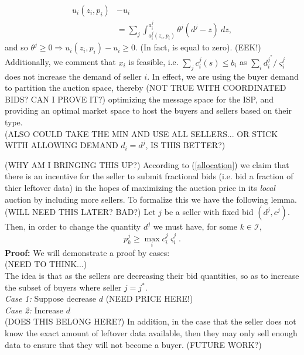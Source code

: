 \documentclass[12pt]{article}
\theoremstyle{definition}
\newcommand{\vs}{\varsigma}
\newcommand{\mcI}{\mathcal{I}}
\begin{document}
\begin{multicols}{2}
\begin{align*}
    u_i(z_i,p_i) &- u_i \\
    &=\displaystyle\sum_{j}\int_{a_i^j(z_i,p_i)}^{a_i^j} \theta^j(d^j
-z) \ dz,
\end{align*}
and so $\theta^j\ge 0 \Rightarrow u_i(z_i,p_i) - u_i \ge 0$. (In fact, is equal to
zero). (EEK!)\\
Additionally, we comment that $x_i$ is feasible, i.e. $\sum_j c_i^j(s) \le b_i$
as $\sum_i d_i^{j^*}/\vs_i^j$ does not increase the demand of seller $i$.
In effect, we are using the buyer demand
to partition the auction space, thereby (NOT TRUE WITH COORDINATED BIDS? CAN I
PROVE IT?) optimizing the message space for the
ISP, and providing an optimal market space to host the buyers and sellers based
on their type. \\
(ALSO COULD TAKE THE MIN AND USE ALL SELLERS... OR STICK WITH ALLOWING DEMAND
$d_i=d^j$, IS THIS BETTER?)

(WHY AM I BRINGING THIS UP?) According to
(\ref{allocation}) we claim that there is an incentive for the seller to
submit fractional bids (i.e. bid a fraction of thier leftover data) in the hopes
of maximizing the auction price in its
\emph{local} auction by including more sellers. To
formalize this we have the following lemma. (WILL NEED THIS LATER? BAD?)
{
\label{incentive}
Let $j$ be a seller with fixed bid $(d^j,c^j)$. Then, in order to change the
quantity $d^j$ we must have, for some $k \in \mcI$,
\begin{equation}
       p_k^j \ge \max_i c_i^j\vs_i^j.
\end{equation}
}
\textbf{Proof:}
We will demonstrate a proof by cases:\\
(NEED TO THINK...)\\
The idea is that as the sellers are decreasing their bid quantities, so as to
increase the subset of buyers where seller $j=j^*$. \\
\emph{Case 1:} Suppose decrease $d$ (NEED PRICE HERE!) \\
\emph{Case 2:} Increase $d$\\

(DOES THIS BELONG HERE?)
In addition, in the case that the seller does not know the exact amount of
leftover data available, then they may only sell enough data to ensure that
they will not become a buyer. (FUTURE WORK?)


\end{multicols}
\end{document}
